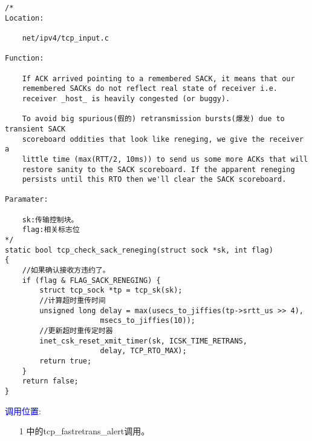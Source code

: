 \begin{verbatim}
/*
Location:

    net/ipv4/tcp_input.c

Function:

    If ACK arrived pointing to a remembered SACK, it means that our
    remembered SACKs do not reflect real state of receiver i.e.
    receiver _host_ is heavily congested (or buggy).

    To avoid big spurious(假的) retransmission bursts(爆发) due to transient SACK
    scoreboard oddities that look like reneging, we give the receiver a
    little time (max(RTT/2, 10ms)) to send us some more ACKs that will
    restore sanity to the SACK scoreboard. If the apparent reneging
    persists until this RTO then we'll clear the SACK scoreboard.

Paramater:

    sk:传输控制块。
    flag:相关标志位
*/
static bool tcp_check_sack_reneging(struct sock *sk, int flag)
{
    //如果确认接收方违约了。
    if (flag & FLAG_SACK_RENEGING) {
        struct tcp_sock *tp = tcp_sk(sk);
        //计算超时重传时间
        unsigned long delay = max(usecs_to_jiffies(tp->srtt_us >> 4),
                      msecs_to_jiffies(10));
        //更新超时重传定时器  
        inet_csk_reset_xmit_timer(sk, ICSK_TIME_RETRANS,
                      delay, TCP_RTO_MAX);
        return true;
    }
    return false;
}
\end{verbatim}

        \textcolor{blue}{调用位置}:
            \begin{enumerate}
                \item[1]        \label{CongestionDeal:tcp_fastretrans_alert}中的tcp\_fastretrans\_alert调用。
            \end{enumerate}
        
